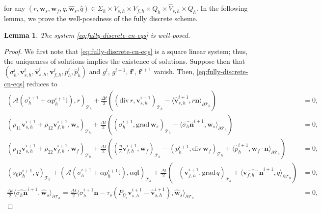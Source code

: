 \documentclass[10pt,letterpaper]{amsart}
\theoremstyle{plain} %
\newtheorem{lemma}[theorem]{Lemma} %
\theoremstyle{remark} %
\newcommand{\vect}[1]{\mathbf{#1}}
\newcommand{\divergence}{\mathrm{div}\,}
\newcommand{\grad}{\mathrm{grad}\,}
\newcommand{\Id}{\mathbb{I}} %
\newcommand{\Ael}{\mathcal{A}} %
\newcommand{\Thprod}[2]{( #1, #2 )_{\mathcal{T}_h}}
\newcommand{\pThprod}[2]{\langle #1, #2 \rangle_{\partial \mathcal{T}_{h}}}
\begin{document}
for any $(r, \vect{w}_s, \vect{w}_f, q, \widehat{\vect{w}}_s, \widehat{q}) \in \Sigma_{h} \times V_{s,h} \times V_{f,h} \times Q_{h} \times \widehat{V}_{s,h}\times \widehat{Q}_{h}$. In the following lemma, we prove the well-posedness of the fully discrete scheme.
%
\begin{lemma}
	The system \eqref{eq:fully-discrete-cn-eqs} is well-posed.
\end{lemma}
%
\begin{proof}
	We first note that \eqref{eq:fully-discrete-cn-eqs} is a square linear system; thus, the uniqueness of solutions implies the existence of solutions. 
	Suppose then that $(\sigma_h^i, \vect{v}_{s,h}^i, \widehat{\vect{v}}_{s,h}^i, \vect{v}_{f,h}^i, p_h^i, \widehat{p}_h^i)$ and $g^i$, $g^{i+1}$, $\vect{f}^{i}$, $\vect{f}^{i+1}$ vanish. Then, \eqref{eq:fully-discrete-cn-eqs} reduces to 
		\begin{align*}
			\Thprod{\Ael(\sigma_{h}^{i+1} + \alpha {p}_{h}^{i+1} \Id)}{r} +\frac{\Delta t}{2} (\Thprod{\divergence r}{\vect{v}_{s,h}^{i+1}} -\pThprod{\widehat{\vect{v}}_{s,h}^{i+1}}{r \vect{n}})& = 0 ,
			\\ 
			\Thprod{\rho_{11}{\vect{v}}_{s,h}^{i+1} +\rho_{12}{\vect{v}}_{f,h}^{i+1}}{\vect{w}_{s}} + \frac{\Delta t}{2}\left(\Thprod{\sigma_{h}^{i+1}}{\grad \vect{w}_{s}} 
			- \pThprod{\widehat{\sigma_{h} \vect{n}}^{i+1} }{\vect{w}_{s}}\right)& = 0, 
			\\
			\Thprod{\rho_{12}{\vect{v}}_{s,h}^{i+1}+\rho_{22}{\vect{v}}_{f,h}^{i+1}}{\vect{w}_{f}} + \frac{\Delta t}{2}\left(\Thprod{\frac{\eta}{\kappa} \vect{v}_{f,h}^{i+1}}{\vect{w}_{f}} 
			- \Thprod{p_{h}^{i+1} }{\divergence\vect{w}_{f}} +\pThprod{\widehat{p}_{h}^{i+1}}{\vect{w}_{f}\cdot\vect{n}}\right) &= 0, 
			\\
			\Thprod{s_{0}{p}_{h}^{i+1}}{q} + \Thprod{\Ael({\sigma}_{h}^{i+1}+\alpha {p}_{h}^{i+1}\Id)}{\alpha q\Id} + \frac{\Delta t}{2} \left(-\Thprod{\vect{v}_{f,h}^{i+1}}{\grad q} 
			+ \pThprod{\widehat{\vect{v}_{f,h}\cdot \vect{n}}^{i+1}}{q}\right) &= 0,
			\\
			\frac{\Delta t}{2}\pThprod{\widehat{\sigma_h \vect{n}}^{i+1} }{\widehat{\vect{w}}_{s}}=
			\frac{\Delta t}{2}\pThprod{\sigma_h^{i+1} \vect{n} - \tau_{s} (P_{\widehat{V}_s} \vect{v}_{s,h}^{i+1} - \widehat{\vect{v}}_{s,h}^{i+1})}{\widehat{\vect{w}}_{s}} &= 0, 

\end{align*}
\end{proof}
\end{document}
